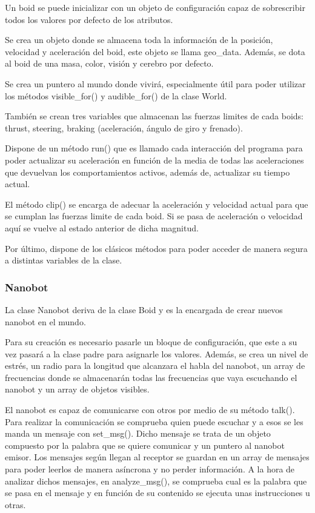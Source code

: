 Un boid se puede inicializar con un objeto de configuración capaz de sobrescribir todos los  valores por defecto de los atributos.

Se crea un objeto donde se almacena toda la información de la posición, velocidad y aceleración del boid, este objeto se llama geo\_data. Además, se dota al boid de una masa, color, visión y cerebro por defecto.
 
Se crea un puntero al mundo donde vivirá, especialmente útil para poder utilizar los métodos visible\_for() y audible\_for() de la clase World.

También se crean tres variables que almacenan las fuerzas limites de cada boids: thrust, steering, braking (aceleración, ángulo de giro y frenado).
 
Dispone de un método run() que es llamado cada interacción del programa para poder actualizar su aceleración en función de la media de todas las aceleraciones que devuelvan los comportamientos activos, además de, actualizar su tiempo actual.
 
El método clip() se encarga de adecuar la aceleración y velocidad actual para que se cumplan las fuerzas limite de cada boid. Si se pasa de aceleración o velocidad aquí se vuelve al estado anterior de dicha magnitud.
 
Por último, dispone de los clásicos métodos para poder acceder de manera segura a distintas variables de la clase.

\subsubsection{Nanobot}
\label{sec:nanobot}

La clase Nanobot deriva de la clase Boid y es la encargada de crear nuevos nanobot en el mundo.
 
Para su creación es necesario pasarle un bloque de configuración, que este a su vez pasará a la clase padre para asignarle los valores. Además, se crea un nivel de estrés, un radio para la longitud que alcanzara el habla del nanobot, un array de frecuencias donde se almacenarán todas las frecuencias que vaya escuchando el nanobot y un array de objetos visibles.
 
El nanobot es capaz de comunicarse con otros por medio de su método talk(). Para realizar la comunicación se comprueba quien puede escuchar y a esos se les manda un mensaje con set\_msg(). Dicho mensaje se trata de un objeto compuesto por la palabra que se quiere comunicar y un puntero al nanobot emisor. Los mensajes según llegan al receptor se guardan en un array de mensajes para poder leerlos de manera asíncrona y no perder información. A la hora de analizar dichos mensajes, en analyze\_msg(), se comprueba cual es la palabra que se pasa en el mensaje y en función de su contenido se ejecuta unas instrucciones u otras. 

